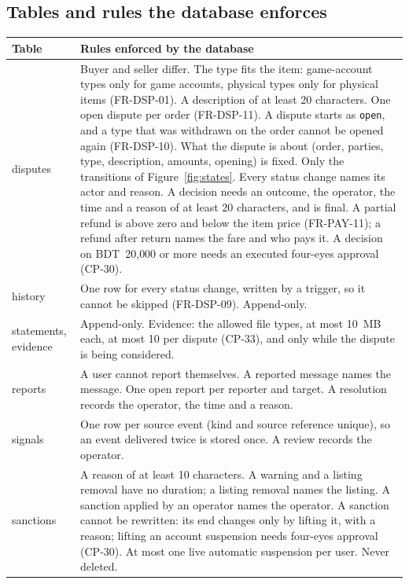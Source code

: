 \documentclass[11pt,a4paper]{article}
\newenvironment{dtable}[1]{\small\begin{longtable}{#1}}{\end{longtable}}
\begin{document}
\subsection{Tables and rules the database enforces}
\begin{dtable}{@{}>{\ttfamily\raggedright\arraybackslash}p{3.6cm}>{\raggedright\arraybackslash}p{11.6cm}@{}}
\toprule
\textnormal{\textbf{Table}} & \textbf{Rules enforced by the database} \\ \midrule \endhead
disputes & Buyer and seller differ. The type fits the item: game-account types only for game accounts, physical types only for physical items (FR-DSP-01). A description of at least 20 characters. One open dispute per order (FR-DSP-11). A dispute starts as \texttt{open}, and a type that was withdrawn on the order cannot be opened again (FR-DSP-10). What the dispute is about (order, parties, type, description, amounts, opening) is fixed. Only the transitions of Figure~\ref{fig:states}. Every status change names its actor and reason. A decision needs an outcome, the operator, the time and a reason of at least 20 characters, and is final. A partial refund is above zero and below the item price (FR-PAY-11); a refund after return names the fare and who pays it. A decision on BDT~20{,}000 or more needs an executed four-eyes approval (CP-30). \\
history & One row for every status change, written by a trigger, so it cannot be skipped (FR-DSP-09). Append-only. \\
statements, evidence & Append-only. Evidence: the allowed file types, at most 10~MB each, at most 10 per dispute (CP-33), and only while the dispute is being considered. \\
reports & A user cannot report themselves. A reported message names the message. One open report per reporter and target. A resolution records the operator, the time and a reason. \\
signals & One row per source event (kind and source reference unique), so an event delivered twice is stored once. A review records the operator. \\
sanctions & A reason of at least 10 characters. A warning and a listing removal have no duration; a listing removal names the listing. A sanction applied by an operator names the operator. A sanction cannot be rewritten: its end changes only by lifting it, with a reason; lifting an account suspension needs four-eyes approval (CP-30). At most one live automatic suspension per user. Never deleted. \\

\end{dtable}
\end{document}
